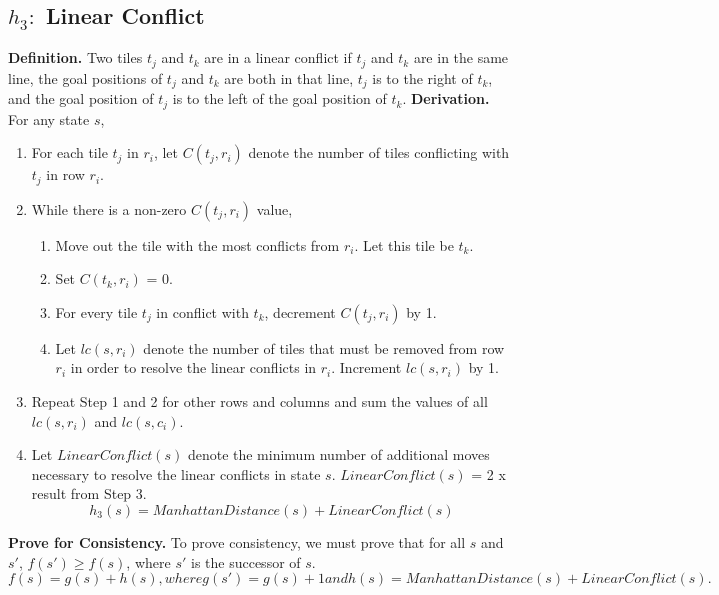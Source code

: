 \documentclass[runningheads]{llncs}
\begin{document}
\subsection{ \(h_3: \) Linear Conflict}
\textbf{Definition.} Two tiles \( t_j \) and \( t_k \) are in a linear conflict if \( t_j \) and \( t_k \) are in the same line, 
the goal positions of \( t_j \) and \( t_k \) are both in that line, 
\( t_j \) is to the right of \( t_k \), 
and the goal position of \( t_j \) is to the left of the goal position of \( t_k \). 
\textbf{Derivation.} For any state \( s \),
\begin{enumerate}
    \item For each tile \( t_j \) in \( r_i \), let \( C(t_j, r_i) \) denote the number of tiles conflicting with \( t_j \) in row \( r_i \).
    \item While there is a non-zero \( C(t_j, r_i) \) value,
    \begin{enumerate}
        \item Move out the tile with the most conflicts from \( r_i \). Let this tile be \( t_k \).
        \item Set \( C(t_k, r_i) \) = 0.
        \item For every tile \( t_j \) in conflict with \( t_k \), decrement \( C(t_j, r_i) \) by 1.
        \item Let \( lc(s, r_i) \) denote the number of tiles that must be removed from row \( r_i \) in order to resolve the linear conflicts in \( r_i \). Increment \( lc(s, r_i) \) by 1.
    \end{enumerate}
    \item Repeat Step 1 and 2 for other rows and columns and sum the values of all \( lc (s, r_i) \) and \( lc(s, c_i) \).
    \item Let \( LinearConflict(s) \) denote the minimum number of additional moves necessary to resolve the linear conflicts in state \( s \). \( LinearConflict(s) \) = 2 x result from Step 3.
    \begin{equation}
        h_3(s) = ManhattanDistance(s) + LinearConflict(s)
    \end{equation}
\end{enumerate}
\textbf{Prove for Consistency.} To prove consistency, we must prove that for all \( s \) and \( s' \), \( f(s') \geq f(s) \), where \( s' \) is the successor of \( s \).
\begin{equation}
    f(s) = g(s) + h(s), where g(s') = g(s) + 1 and h(s) = ManhattanDistance(s) + LinearConflict(s).
\end{equation}
\end{document}
